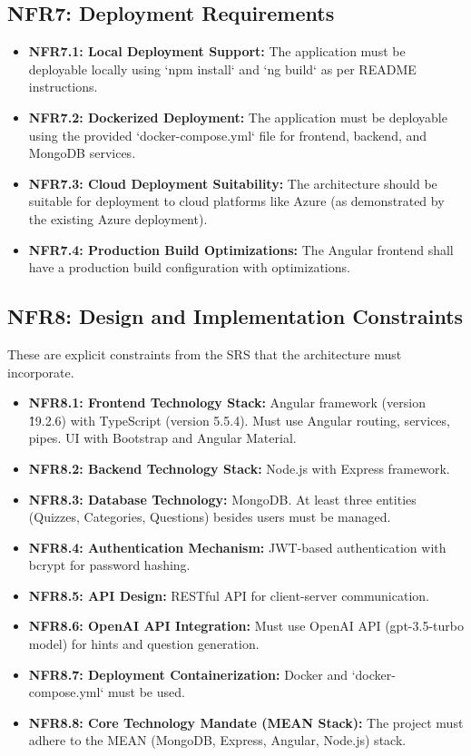 \subsection{NFR7: Deployment Requirements}
\begin{itemize}
    \item \textbf{NFR7.1: Local Deployment Support:} The application must be deployable locally using `npm install` and `ng build` as per README instructions.
    \item \textbf{NFR7.2: Dockerized Deployment:} The application must be deployable using the provided `docker-compose.yml` file for frontend, backend, and MongoDB services.
    \item \textbf{NFR7.3: Cloud Deployment Suitability:} The architecture should be suitable for deployment to cloud platforms like Azure (as demonstrated by the existing Azure deployment).
    \item \textbf{NFR7.4: Production Build Optimizations:} The Angular frontend shall have a production build configuration with optimizations.
\end{itemize}

\subsection{NFR8: Design and Implementation Constraints}
These are explicit constraints from the SRS that the architecture must incorporate.
\begin{itemize}
    \item \textbf{NFR8.1: Frontend Technology Stack:} Angular framework (version \^19.2.6) with TypeScript (version 5.5.4). Must use Angular routing, services, pipes. UI with Bootstrap and Angular Material.
    \item \textbf{NFR8.2: Backend Technology Stack:} Node.js with Express framework.
    \item \textbf{NFR8.3: Database Technology:} MongoDB. At least three entities (Quizzes, Categories, Questions) besides users must be managed.
    \item \textbf{NFR8.4: Authentication Mechanism:} JWT-based authentication with bcrypt for password hashing.
    \item \textbf{NFR8.5: API Design:} RESTful API for client-server communication.
    \item \textbf{NFR8.6: OpenAI API Integration:} Must use OpenAI API (gpt-3.5-turbo model) for hints and question generation.
    \item \textbf{NFR8.7: Deployment Containerization:} Docker and `docker-compose.yml` must be used.
    \item \textbf{NFR8.8: Core Technology Mandate (MEAN Stack):} The project must adhere to the MEAN (MongoDB, Express, Angular, Node.js) stack.
\end{itemize}
